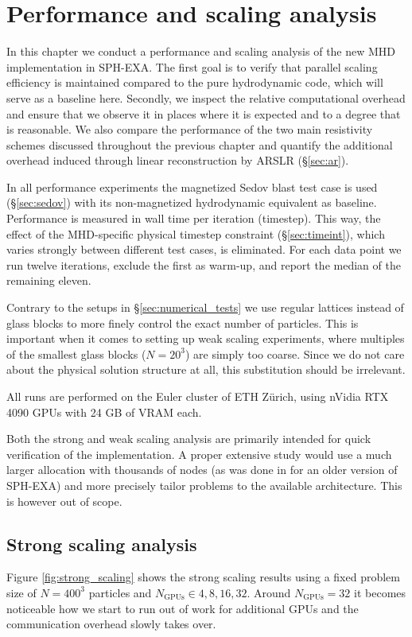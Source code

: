 \section{Performance and scaling analysis}
\label{sec:performance}

In this chapter we conduct a performance and scaling analysis of the new MHD implementation in SPH-EXA. The first goal is to verify that parallel scaling efficiency is maintained compared to the pure hydrodynamic code, which will serve as a baseline here. Secondly, we inspect the relative computational overhead and ensure that we observe it in places where it is expected and to a degree that is reasonable. We also compare the performance of the two main resistivity schemes discussed throughout the previous chapter and quantify the additional overhead induced through linear reconstruction by ARSLR (§\ref{sec:ar}). 

In all performance experiments the magnetized Sedov blast test case is used (§\ref{sec:sedov}) with its non-magnetized hydrodynamic equivalent as baseline. Performance is measured in wall time per iteration (timestep). This way, the effect of the MHD-specific physical timestep constraint (§\ref{sec:timeint}), which varies strongly between different test cases, is eliminated. For each data point we run twelve iterations, exclude the first as warm-up, and report the median of the remaining eleven.

Contrary to the setups in §\ref{sec:numerical_tests} we use regular lattices instead of glass blocks to more finely control the exact number of particles. This is important when it comes to setting up weak scaling experiments, where multiples of the smallest glass blocks ($N=20^3$) are simply too coarse. Since we do not care about the physical solution structure at all, this substitution should be irrelevant.

All runs are performed on the Euler cluster of ETH Zürich, using nVidia RTX 4090 GPUs with 24 GB of VRAM each. 

Both the strong and weak scaling analysis are primarily intended for quick verification of the implementation. A proper extensive study would use a much larger allocation with thousands of nodes (as was done in \cite{Cavelan2020} for an older version of SPH-EXA) and more precisely tailor problems to the available architecture. This is however out of scope.

\subsection{Strong scaling analysis}
\label{sec:strong_scaling}
Figure \ref{fig:strong_scaling} shows the strong scaling results using a fixed problem size of $N=400^3$ particles and $N_\mathrm{GPUs} \in {4,8,16,32}$. Around $N_\mathrm{GPUs}=32$ it becomes noticeable how we start to run out of work for additional GPUs and the communication overhead slowly takes over. 

